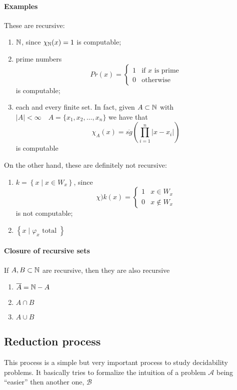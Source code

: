 \paragraph{Examples}
These are recursive:
\begin{enumerate}[label=(\alph*)]
\item $\mathbb{N}$, since $\chi_{\mathbb{N}} (x) = 1$ is computable;
\item prime numbers
  \[
    Pr(x) = \begin{cases}
      1 & \mbox{if $x$ is prime} \\
      0 & \mbox{otherwise}
    \end{cases}
  \]
  is computable;
\item each and every finite set. In fact, given $A \subset \mathbb{N}$ with
  $|A| < \infty \quad A = \{x_1, x_2, \dots, x_n\}$ we have that
  \[
    \chi_A(x) = \overline{sg}\left( \prod_{i=1}^n|x - x_i| \right)
  \]
  is computable
\end{enumerate}

On the other hand, these are definitely not recursive:
\begin{enumerate}[label=(\alph*)]
\item $k = \left\{ x \; | \; x \in W_x \right\} $, since
  \[
    \chi){k(x)} = \begin{cases}
      1 & x \in W_x \\
      0 & x \notin W_x
    \end{cases}
  \]
  is not computable;
\item $\left\{ x \; | \; \varphi_x \mbox{ total } \right\} $
\end{enumerate}

\mbox{\\}

\paragraph{Closure of recursive sets}
If $A,B \subset \mathbb{N}$ are recursive, then they are also recursive
\begin{enumerate}[label=\arabic*)]
\item $\overline{A} = \mathbb{N} - A$
\item $A \cap B$
\item $A \cup B$
\end{enumerate}

\subsection{Reduction process}
This process is a simple but very important process to study decidability
problems. It basically tries to formalize the intuition of a problem
$\mathcal{A}$ being ``easier'' then another one, $\mathcal{B}$


